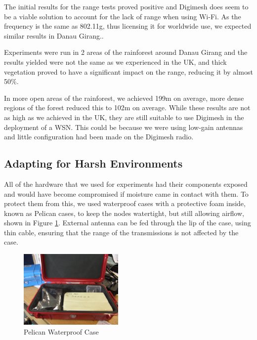 The initial results for the range tests proved positive and Digimesh does seem to be a viable solution to account for the lack of range when using Wi-Fi. As the frequency is the same as 802.11g, thus licensing it for worldwide use, we expected similar results in Danau Girang..
						
Experiments were run in 2 areas of the rainforest around Danau Girang and the results yielded were not the same as we experienced in the UK, and thick vegetation proved to have a significant impact on the range, reducing it by almost 50\%.
			
In more open areas of the rainforest, we achieved 199m on average, more dense regions of the forest reduced this to 102m on average. While these results are not as high as we achieved in the UK, they are still suitable to use Digimesh in the deployment of a WSN. This could be because we were using low-gain antennas and little configuration had been made on the Digimesh radio.

\subsection{Adapting for Harsh Environments}
	All of the hardware that we used for experiments had their components exposed and would have become compromised if moisture came in contact with them. To protect them from this, we used waterproof cases with a protective foam inside, known as Pelican cases, to keep the nodes watertight, but still allowing airflow, shown in Figure \ref{tech:pelican}.
	External antenna can be fed through the lip of the case, using thin cable, ensuring that the range of the transmissions is not affected by the case. 

			\begin{figure}[!t]
			\centering
			\includegraphics[width=0.45\textwidth]{Chap3/figures/pelican}
			\caption{Pelican Waterproof Case}
			\label{tech:pelican}
			\end{figure}

%	

